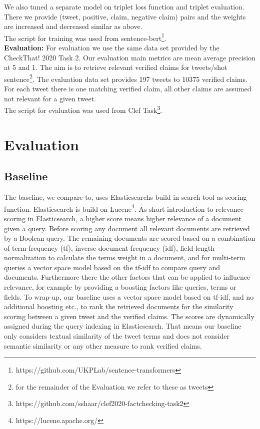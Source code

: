 \documentclass{article}
\begin{document}
We also tuned a separate model on triplet loss function and triplet evaluation.
There we provide (tweet, positive, claim, negative claim) pairs and the weights are increased and decreased similar as above.\\
The script for training was used from sentence-bert\footnote{https://github.com/UKPLab/sentence-transformers}.\\
\noindent\textbf{Evaluation:}
For evaluation we use the same data set provided by the CheckThat! 2020 Task 2. 
Our evaluation main metrics are mean average precision at 5 and 1.
The aim is to retrieve relevant verified claims for tweets/shot sentence\footnote{for the remainder of the Evaluation we refer to these as tweets}. 
The evaluation data set provides 197 tweets to 10375 verified claims.
For each tweet there is one matching verified claim, all other claims are assumed not relevant for a given tweet.\\
The script for evaluation was used from Clef Task\footnote{https://github.com/sshaar/clef2020-factchecking-task2}.
\section{Evaluation}
\subsection{Baseline}
The baseline, we compare to, uses Elasticsearchs build in search tool as scoring function. Elasticsearch is build on Lucene\footnote{https://lucene.apache.org/}.
As short introduction to relevance scoring in Elasticsearch, a higher score means higher relevance of a document given a query. Before scoring any document all relevant documents are retrieved by a Boolean query.
The remaining documents are scored based on a combination of term-frequency (tf), inverse document frequency (idf), field-length normalization to calculate the terms weight in a document, and for multi-term queries a vector space model based on the tf-idf to compare query and documents.
Furthermore there the other factors that can be applied to influence relevance, for example by providing a boosting factors like queries, terms or fields.
To wrap-up, our baseline uses a vector space model based on tf-idf, and no additional boosting etc., to rank the retrieved documents for the similarity scoring between a given tweet and the verified claims. The scores are dynamically assigned during the query indexing in Elasticsearch.
That means our baseline only considers textual similarity of the tweet terms and does not consider semantic similarity or any other measure to rank verified claims.
\end{document}
